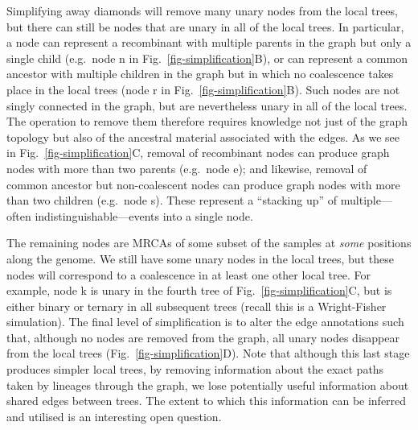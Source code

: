 \documentclass{article}
\newcommand{\noderef}[1]{\textsf{#1}}
\begin{document}
Simplifying away diamonds will remove many unary nodes from the
local trees, but there can still be nodes that are unary in all
of the local trees. In particular, a node can represent a recombinant
with multiple parents in the graph but only a single child (e.g.\ node \noderef{n}
in Fig.~\ref{fig-simplification}B), or can represent a common ancestor with
multiple children in the graph but in which no coalescence takes place
in the local trees
(node \noderef{r} in Fig.~\ref{fig-simplification}B).
Such nodes are not singly connected in the graph, but are nevertheless unary in
all of the local trees.
The operation to remove them
therefore requires knowledge not just of the graph topology but also of the
ancestral material associated with the edges.
As we see in Fig.~\ref{fig-simplification}C,
removal of recombinant nodes can produce graph nodes with
more than two parents (e.g.~node \noderef{e}); and likewise, removal of
common ancestor but non-coalescent nodes can produce graph nodes with
more than two children (e.g.~node \noderef{s}). These represent a ``stacking up'' of
multiple---often indistinguishable---events into a single node.


The remaining nodes are MRCAs of some subset of the samples
at \emph{some} positions along the genome. We still have
some unary nodes in the local trees, but these nodes will
correspond to a coalescence in at least one other
local tree. For example, node  \noderef{k} is unary in the fourth tree
of Fig.~\ref{fig-simplification}C, but is either binary
or ternary in all subsequent trees (recall this is a Wright-Fisher
simulation). The final level of simplification is to alter the edge annotations
such that, although no nodes are removed from the graph, all
unary nodes disappear from the local trees (Fig.~\ref{fig-simplification}D).
Note that although this last stage produces simpler local trees, by
removing information about the exact paths taken by lineages through
the graph, we lose potentially useful information about shared edges
between trees. The extent to which this information can be inferred
and utilised is an interesting open question.
\end{document}
